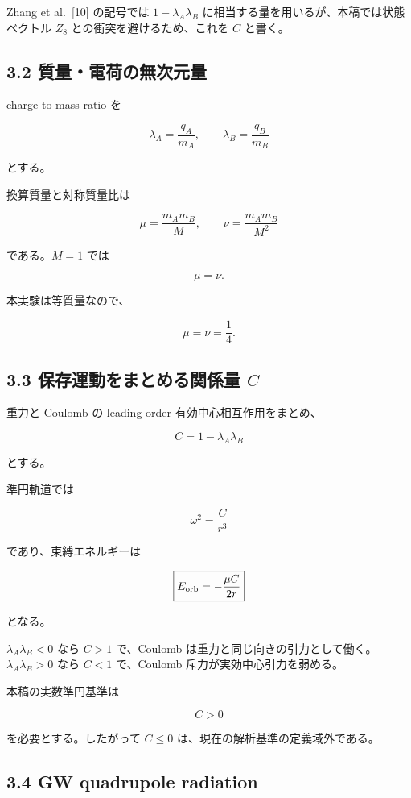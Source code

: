 \documentclass[
  a4paper,
]{ltjsarticle}
\begin{document}
Zhang et al.~{[}10{]} の記号では \(1-\lambda_A\lambda_B\)
に相当する量を用いるが、本稿では状態ベクトル \(Z_8\)
との衝突を避けるため、これを \(C\) と書く。

\subsection{3.2
質量・電荷の無次元量}\label{ux8ceaux91cfux96fbux8377ux306eux7121ux6b21ux5143ux91cf}

charge-to-mass ratio を

\[
\lambda_A=\frac{q_A}{m_A},
\qquad
\lambda_B=\frac{q_B}{m_B}
\]

とする。

換算質量と対称質量比は

\[
\mu=\frac{m_A m_B}{M},
\qquad
\nu=\frac{m_A m_B}{M^2}
\]

である。\(M=1\) では

\[
\mu=\nu.
\]

本実験は等質量なので、

\[
\mu=\nu=\frac14.
\]

\subsection{\texorpdfstring{3.3 保存運動をまとめる関係量
\(C\)}{3.3 保存運動をまとめる関係量 C}}\label{ux4fddux5b58ux904bux52d5ux3092ux307eux3068ux3081ux308bux95a2ux4fc2ux91cf-c}

重力と Coulomb の leading-order 有効中心相互作用をまとめ、

\[
\boxed{
C=1-\lambda_A\lambda_B
}
\]

とする。

準円軌道では

\[
\boxed{
\omega^2=\frac{C}{r^3}
}
\]

であり、束縛エネルギーは

\[
\boxed{
E_{\rm orb}=-\frac{\mu C}{2r}
}
\]

となる。

\(\lambda_A\lambda_B<0\) なら \(C>1\) で、Coulomb
は重力と同じ向きの引力として働く。\(\lambda_A\lambda_B>0\) なら \(C<1\)
で、Coulomb 斥力が実効中心引力を弱める。

本稿の実数準円基準は

\[
\boxed{C>0}
\]

を必要とする。したがって \(C\le0\) は、現在の解析基準の定義域外である。

\subsection{3.4 GW quadrupole radiation}\label{gw-quadrupole-radiation}
\end{document}
